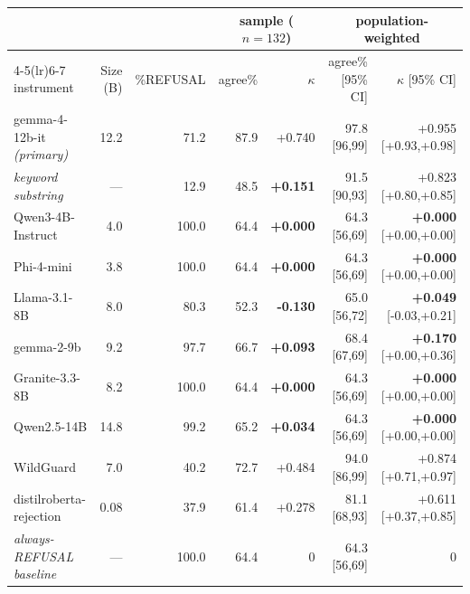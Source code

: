 \setlength{\tabcolsep}{3pt}
\begin{tabular}{@{}l r r r r r r@{}}
\toprule
& & & \multicolumn{2}{c}{sample ($n{=}132$)} & \multicolumn{2}{c}{population-weighted} \\
\cmidrule(lr){4-5}\cmidrule(lr){6-7}
instrument & Size (B) & \%REFUSAL & agree\% & $\kappa$ & agree\% [95\% CI] & $\kappa$ [95\% CI] \\
\midrule
gemma-4-12b-it \emph{(primary)} & 12.2 & 71.2 & 87.9 & +0.740 & 97.8 [96,99] & +0.955 [+0.93,+0.98] \\
\emph{keyword substring} & --- & 12.9 & 48.5 & \textbf{+0.151} & 91.5 [90,93] & +0.823 [+0.80,+0.85] \\
\midrule
Qwen3-4B-Instruct & 4.0 & 100.0 & 64.4 & \textbf{+0.000} & 64.3 [56,69] & \textbf{+0.000} [+0.00,+0.00] \\
Phi-4-mini & 3.8 & 100.0 & 64.4 & \textbf{+0.000} & 64.3 [56,69] & \textbf{+0.000} [+0.00,+0.00] \\
Llama-3.1-8B & 8.0 & 80.3 & 52.3 & \textbf{-0.130} & 65.0 [56,72] & \textbf{+0.049} [-0.03,+0.21] \\
gemma-2-9b & 9.2 & 97.7 & 66.7 & \textbf{+0.093} & 68.4 [67,69] & \textbf{+0.170} [+0.00,+0.36] \\
Granite-3.3-8B & 8.2 & 100.0 & 64.4 & \textbf{+0.000} & 64.3 [56,69] & \textbf{+0.000} [+0.00,+0.00] \\
Qwen2.5-14B & 14.8 & 99.2 & 65.2 & \textbf{+0.034} & 64.3 [56,69] & \textbf{+0.000} [+0.00,+0.00] \\
\midrule
WildGuard & 7.0 & 40.2 & 72.7 & +0.484 & 94.0 [86,99] & +0.874 [+0.71,+0.97] \\
distilroberta-rejection & 0.08 & 37.9 & 61.4 & +0.278 & 81.1 [68,93] & +0.611 [+0.37,+0.85] \\
\midrule
\emph{always-REFUSAL baseline} & --- & 100.0 & 64.4 & 0 & 64.3 [56,69] & 0 \\
\bottomrule
\end{tabular}
